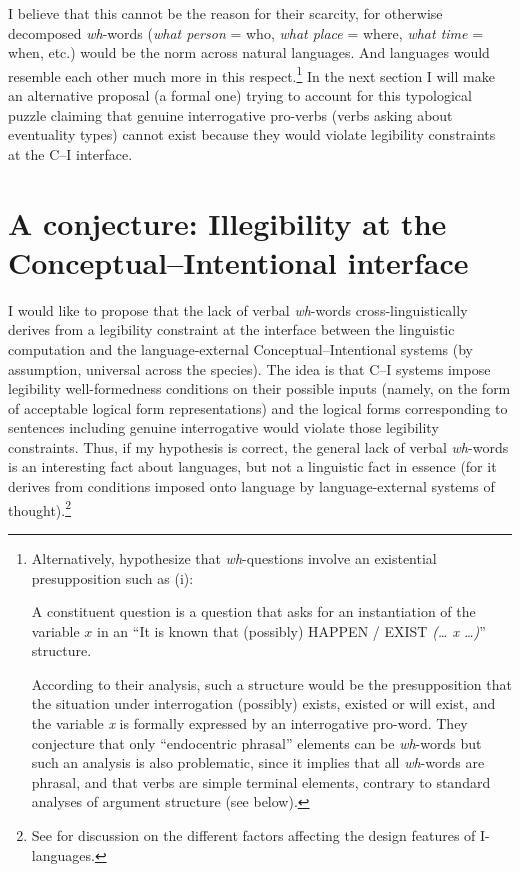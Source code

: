 \documentclass[output=paper]{langsci/langscibook}
\begin{document}
I believe that this cannot be the reason for their scarcity, for otherwise
decomposed \emph{wh}-words (\emph{what person} = who, \emph{what place }
= where, \emph{what time} = when, etc.) would be the norm across natural
languages. And languages would resemble each other much more in this
respect.\footnote{Alternatively, \citet{idiatov.vanderauwera2004} hypothesize
    that \emph{wh}-questions involve an existential presupposition such as
    (i):

\begin{exe}
 \label{i} A constituent question is a question that asks for an
instantiation of the variable $x$ in an ``It is known that (possibly) HAPPEN /
EXIST \emph{(\dots{} x \dots{})}'' structure.
\end{exe}
According to their analysis, such a structure would be the presupposition that
the situation under interrogation (possibly) exists, existed or will exist, and
the variable \emph{x} is formally expressed by an interrogative pro-word. They
conjecture that only ``endocentric phrasal'' elements can be \emph{wh}-words but such an analysis is also problematic, since it implies that all \emph{wh}-words are phrasal, and that verbs are simple terminal elements, contrary to standard analyses of argument structure (see below).}
In the next section I will make an alternative proposal (a formal one) trying
to account for this typological puzzle claiming that genuine interrogative
pro-verbs (verbs asking about eventuality types) cannot exist because they
would violate legibility constraints at the C--I interface.

\section{A conjecture: Illegibility at the Conceptual--Intentional
interface}\label{sec:3}

I would like to propose that the lack of verbal \emph{wh}-words
cross-linguistically derives from a legibility constraint at the interface
between the linguistic computation and the language-external
Conceptual--Intentional systems (by assumption, universal across the species).
The idea is that C--I systems impose legibility well-formedness conditions on
their possible inputs (namely, on the form of acceptable logical form
representations) and the logical forms corresponding to sentences including
genuine interrogative  would violate those legibility constraints.
Thus, if my hypothesis is correct, the general lack of verbal \emph{wh}-words
is an interesting fact about languages, but not a linguistic fact in essence
(for it derives from conditions imposed onto language by language-external
systems of thought).\footnote{See
\citet{Chomsky2005,BerwickEtAl2011,Roberts2012,biberauer.roberts2017} for
discussion on the different factors affecting the design features of
I-languages.}
\end{document}

